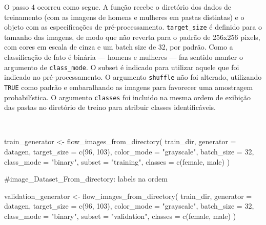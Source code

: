 \documentclass[
  a4paperpaper,
]{article}
\newenvironment{Shaded}{\begin{snugshade}}{\end{snugshade}}
\newcommand{\AttributeTok}[1]{\textcolor[rgb]{0.40,0.45,0.13}{#1}}
\newcommand{\CommentTok}[1]{\textcolor[rgb]{0.37,0.37,0.37}{#1}}
\newcommand{\DecValTok}[1]{\textcolor[rgb]{0.68,0.00,0.00}{#1}}
\newcommand{\FunctionTok}[1]{\textcolor[rgb]{0.28,0.35,0.67}{#1}}
\newcommand{\NormalTok}[1]{\textcolor[rgb]{0.00,0.23,0.31}{#1}}
\newcommand{\OtherTok}[1]{\textcolor[rgb]{0.00,0.23,0.31}{#1}}
\newcommand{\StringTok}[1]{\textcolor[rgb]{0.13,0.47,0.30}{#1}}
\begin{document}
O passo 4 ocorreu como segue. A função recebe o diretório dos dados de
treinamento (com as imagens de homens e mulheres em pastas distintas) e
o objeto com as especificações de pré-processamento.
\texttt{target\_size} é definido para o tamanho das imagens, de modo que
não reverta para o padrão de 256x256 pixels, com cores em escala de
cinza e um batch size de 32, por padrão. Como a classificação de fato é
binária --- homens e mulheres --- faz sentido manter o argumento de
\texttt{class\_mode}. O subset é indicado para utilizar aquele que foi
indicado no pré-processamento. O argumento \texttt{shuffle} não foi
alterado, utilizando \texttt{TRUE} como padrão e embaralhando as imagens
para favorecer uma amostragem probabilística. O argumento
\texttt{classes} foi incluido na mesma ordem de exibição das pastas no
diretório de treino para atribuir classes identificáveis.

~

\begin{Shaded}
\begin{Highlighting}[]
\NormalTok{train\_generator }\OtherTok{\textless{}{-}} \FunctionTok{flow\_images\_from\_directory}\NormalTok{(}
\NormalTok{  train\_dir,}
  \AttributeTok{generator =}\NormalTok{ datagen,}
  \AttributeTok{target\_size =} \FunctionTok{c}\NormalTok{(}\DecValTok{96}\NormalTok{, }\DecValTok{103}\NormalTok{),}
  \AttributeTok{color\_mode =} \StringTok{"grayscale"}\NormalTok{,}
  \AttributeTok{batch\_size =} \DecValTok{32}\NormalTok{,}
  \AttributeTok{class\_mode =} \StringTok{"binary"}\NormalTok{,}
  \AttributeTok{subset =} \StringTok{"training"}\NormalTok{,}
  \AttributeTok{classes =} \FunctionTok{c}\NormalTok{(}\StringTok{\textquotesingle{}female\textquotesingle{}}\NormalTok{, }\StringTok{\textquotesingle{}male\textquotesingle{}}\NormalTok{)}
\NormalTok{)}

\CommentTok{\#image\_Dataset\_From\_directory: labels na ordem}

\NormalTok{validation\_generator }\OtherTok{\textless{}{-}} \FunctionTok{flow\_images\_from\_directory}\NormalTok{(}
\NormalTok{  train\_dir,}
  \AttributeTok{generator =}\NormalTok{ datagen,}
  \AttributeTok{target\_size =} \FunctionTok{c}\NormalTok{(}\DecValTok{96}\NormalTok{, }\DecValTok{103}\NormalTok{),}
  \AttributeTok{color\_mode =} \StringTok{"grayscale"}\NormalTok{,}
  \AttributeTok{batch\_size =} \DecValTok{32}\NormalTok{,}
  \AttributeTok{class\_mode =} \StringTok{"binary"}\NormalTok{,}
  \AttributeTok{subset =} \StringTok{"validation"}\NormalTok{,}
  \AttributeTok{classes =} \FunctionTok{c}\NormalTok{(}\StringTok{\textquotesingle{}female\textquotesingle{}}\NormalTok{, }\StringTok{\textquotesingle{}male\textquotesingle{}}\NormalTok{)}
\NormalTok{)}
\end{Highlighting}
\end{Shaded}
\end{document}
